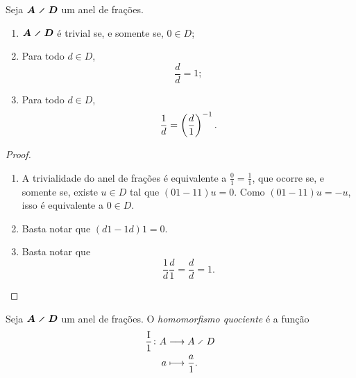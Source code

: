 \begin{proposition}
Seja $\bm{A \olddiv D}$ um anel de frações.
	\begin{enumerate}
	\item $\bm{A \olddiv D}$ é trivial se, e somente se, $0 \in D$;
	
	\item Para todo $d \in D$,
		\begin{equation*}
		\frac{d}{d} =1;
		\end{equation*}
	
	\item Para todo $d \in D$,
		\begin{equation*}
		\frac{1}{d} = \left( \frac{d}{1} \right)^{-1}.
		\end{equation*}
	\end{enumerate}
\end{proposition}
\begin{proof}
	\begin{enumerate}
	\item A trivialidade do anel de frações é equivalente a $\frac{0}{1}=\frac{1}{1}$, que ocorre se, e somente se, existe $u \in D$ tal que $(01-11)u = 0$. Como $(01-11)u=-u$, isso é equivalente a $0 \in D$.
	
	\item Basta notar que $(d1-1d)1=0$.
	
	\item Basta notar que
		\begin{equation*}
		\frac{1}{d} \frac{d}{1} = \frac{d}{d} = 1.
		\end{equation*}
	\end{enumerate}

\end{proof}

\begin{definition}
Seja $\bm{A \olddiv D}$ um anel de frações. O \emph{homomorfismo quociente} é a função
	\begin{align*}
	\func{\frac{\Id}{1}}{A}{A \olddiv D}{a}{\frac{a}{1}}.
	\end{align*}
\end{definition}

